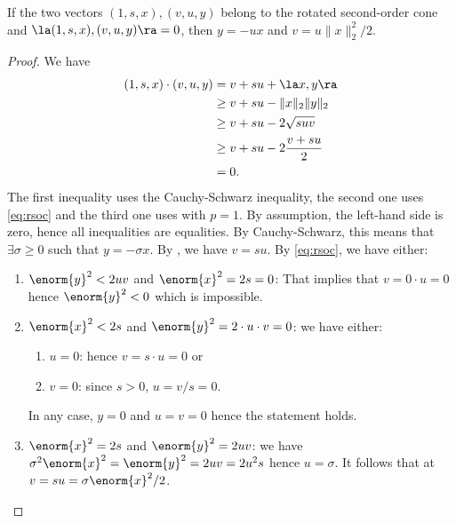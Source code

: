 \documentclass[11pt,twoside,a4paper,openright]{uclouvain-thesis}
\begin{document}
\begin{mylem}
  \label{lem:rsocperp}
  If the two vectors $(1, s, x), (v, u, y)$ belong to the rotated second-order cone and
  $\la (1, s, x), (v, u, y) \ra = 0$, then
  $y = -ux$ and $v = u \lVert x \rVert_2^2/2$.

  \begin{proof}
    We have
    \begin{align*}
      (1, s, x) \cdot (v, u, y) %
      & = v + s u + \la x, y \ra\\
      & \ge
      v + s u - \lVert x\lVert_2 \lVert y\lVert_2\\
      & \ge
      v + s u - 2 \sqrt{s u v}\\
      & \ge
      v + s u - 2 \frac{v + s u}{2}\\
      & = 0.
    \end{align*}
    The first inequality uses the Cauchy-Schwarz inequality,
    the second one uses \eqref{eq:rsoc} and the third one uses  with $p = 1$.
    By assumption, the left-hand side is zero, hence all inequalities
    are equalities. By Cauchy-Schwarz, this means that $\exists \sigma \ge 0$ such
    that $y = -\sigma x$. By , we have $v = s u$.
    By \eqref{eq:rsoc}, we have either:
    \begin{enumerate}
      \item $\enorm{y}^2 < 2  u  v$ and $\enorm{x}^2 = 2 s = 0$:
        That implies
        that $v = 0 \cdot u = 0$ hence $\enorm{y}^2 < 0$ which is impossible.
      \item $\enorm{x}^2 < 2 s$ and $\enorm{y}^2 = 2 \cdot u \cdot v = 0$:
        we have either:
        \begin{enumerate}
          \item $u = 0$: hence $v = s \cdot u = 0$ or
          \item $v = 0$: since $s > 0$, $u = v / s = 0$.
        \end{enumerate}
         In any case, $y = 0$ and $u = v = 0$ hence the statement holds.
       \item $\enorm{x}^2 = 2 s$ and $\enorm{y}^2 = 2 u v$: we have
         $\sigma^2 \enorm{x}^2 = \enorm{y}^2 = 2 u v = 2 u^2 s$ hence
         $u = \sigma$. It follows that at $v = s u = \sigma \enorm{x}^2/2$.
    \end{enumerate}
  \end{proof}
\end{mylem}
\end{document}
